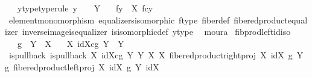 \begin{isabellebody}
\ \ \ y{\isacharunderscore}{\kern0pt}type{\isacharbrackleft}{\kern0pt}type{\isacharunderscore}{\kern0pt}rule{\isacharbrackright}{\kern0pt}{\isacharcolon}{\kern0pt}\ {\isachardoublequoteopen}y\ {\isacharcolon}{\kern0pt}\ {\isasymone}\ {\isasymrightarrow}\ Y{\isachardoublequoteclose}\isanewline
\ \ \ {\isachardoublequoteopen}f\isactrlsup {\isacharminus}{\kern0pt}y{\isacharbraceright}{\kern0pt}\ {\isasymcong}\ X\ \isactrlbsub f\isactrlesub {\isasymtimes}\isactrlsub c\isactrlbsub y\isactrlesub {\isasymone}{\isachardoublequoteclose}\isanewline
%
\isadelimproof
\ \ %
\endisadelimproof
%
\isatagproof
{}\isamarkupfalse%
\ element{\isacharunderscore}{\kern0pt}monomorphism\ equalizers{\isacharunderscore}{\kern0pt}isomorphic\ f{\isacharunderscore}{\kern0pt}type\ fiber{\isacharunderscore}{\kern0pt}def\ fibered{\isacharunderscore}{\kern0pt}product{\isacharunderscore}{\kern0pt}equalizer\ inverse{\isacharunderscore}{\kern0pt}image{\isacharunderscore}{\kern0pt}is{\isacharunderscore}{\kern0pt}equalizer\ is{\isacharunderscore}{\kern0pt}isomorphic{\isacharunderscore}{\kern0pt}def\ y{\isacharunderscore}{\kern0pt}type\ \isamarkupfalse%
\ moura%
\endisatagproof
{\isafoldproof}%
%
\isadelimproof
\isanewline
%
\endisadelimproof
\isanewline
{}\isamarkupfalse%
\ fib{\isacharunderscore}{\kern0pt}prod{\isacharunderscore}{\kern0pt}left{\isacharunderscore}{\kern0pt}id{\isacharunderscore}{\kern0pt}iso{\isacharcolon}{\kern0pt}\isanewline
\ \ \ {\isachardoublequoteopen}g\ {\isacharcolon}{\kern0pt}\ Y\ {\isasymrightarrow}\ X{\isachardoublequoteclose}\isanewline
\ \ \ {\isachardoublequoteopen}{\isacharparenleft}{\kern0pt}X\ \isactrlbsub id{\isacharparenleft}{\kern0pt}X{\isacharparenright}{\kern0pt}\isactrlesub {\isasymtimes}\isactrlsub c\isactrlbsub g\isactrlesub \ Y{\isacharparenright}{\kern0pt}\ {\isasymcong}\ Y{\isachardoublequoteclose}\isanewline
%
\isadelimproof
%
\endisadelimproof
%
\isatagproof
{}\isamarkupfalse%
\ {\isacharminus}{\kern0pt}\ \isanewline
\ \ \isamarkupfalse%
\ is{\isacharunderscore}{\kern0pt}pullback{\isacharcolon}{\kern0pt}\ {\isachardoublequoteopen}is{\isacharunderscore}{\kern0pt}pullback\ {\isacharparenleft}{\kern0pt}X\ \isactrlbsub id{\isacharparenleft}{\kern0pt}X{\isacharparenright}{\kern0pt}\isactrlesub {\isasymtimes}\isactrlsub c\isactrlbsub g\isactrlesub \ Y{\isacharparenright}{\kern0pt}\ Y\ X\ X\ {\isacharparenleft}{\kern0pt}fibered{\isacharunderscore}{\kern0pt}product{\isacharunderscore}{\kern0pt}right{\isacharunderscore}{\kern0pt}proj\ X\ {\isacharparenleft}{\kern0pt}id{\isacharparenleft}{\kern0pt}X{\isacharparenright}{\kern0pt}{\isacharparenright}{\kern0pt}\ g\ Y{\isacharparenright}{\kern0pt}\ g\ {\isacharparenleft}{\kern0pt}fibered{\isacharunderscore}{\kern0pt}product{\isacharunderscore}{\kern0pt}left{\isacharunderscore}{\kern0pt}proj\ X\ {\isacharparenleft}{\kern0pt}id{\isacharparenleft}{\kern0pt}X{\isacharparenright}{\kern0pt}{\isacharparenright}{\kern0pt}\ g\ Y{\isacharparenright}{\kern0pt}\ {\isacharparenleft}{\kern0pt}id{\isacharparenleft}{\kern0pt}X{\isacharparenright}{\kern0pt}{\isacharparenright}{\kern0pt}{\isachardoublequoteclose}\isanewline

\end{isabellebody}
